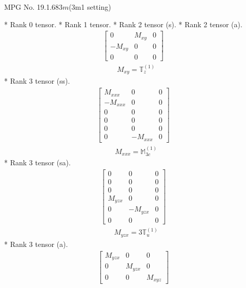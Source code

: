 \documentclass[fleqn,8pt,landscape]{jsarticle}
\begin{document}
\setcounter{MaxMatrixCols}{32}

\renewcommand{\tablename}{Table~}
\renewcommand{\figurename}{Figure~}
\begin{center}
\LARGE
MPG No. 19.1.68\quad$3m$\quad(3m1 setting)
\end{center}
* Rank 0 tensor.
* Rank 1 tensor.
* Rank 2 tensor (s).
* Rank 2 tensor (a).
\begin{align*}
\begin{bmatrix} 0 & M_{xy} & 0 \\ - M_{xy} & 0 & 0 \\ 0 & 0 & 0 \end{bmatrix}
\end{align*}
\begin{align*}
& M_{xy} = \mathbb{T}_{z}^{(1)}
\end{align*}
* Rank 3 tensor (ss).
\begin{align*}
\begin{bmatrix} M_{xxx} & 0 & 0 \\ - M_{xxx} & 0 & 0 \\ 0 & 0 & 0 \\ 0 & 0 & 0 \\ 0 & 0 & 0 \\ 0 & - M_{xxx} & 0 \end{bmatrix}
\end{align*}
\begin{align*}
& M_{xxx} = \mathbb{M}_{3c}^{(1)}
\end{align*}
* Rank 3 tensor (sa).
\begin{align*}
\begin{bmatrix} 0 & 0 & 0 \\ 0 & 0 & 0 \\ 0 & 0 & 0 \\ M_{yzx} & 0 & 0 \\ 0 & - M_{yzx} & 0 \\ 0 & 0 & 0 \end{bmatrix}
\end{align*}
\begin{align*}
& M_{yzx} = 3 \mathbb{T}_{u}^{(1)}
\end{align*}
* Rank 3 tensor (a).
\begin{align*}
\begin{bmatrix} M_{yzx} & 0 & 0 \\ 0 & M_{yzx} & 0 \\ 0 & 0 & M_{xyz} \end{bmatrix}
\end{align*}
\end{document}
